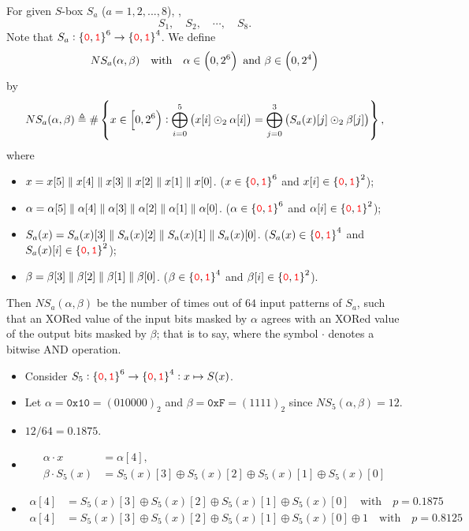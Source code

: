 \begin{tcolorbox}[colframe=defcolor,title={\color{white}\bf SBOX}]
\begin{definition}
For given $S$-box $S_a$ ($a = 1,2,...,8$), \ie, \[
S_1,\quad S_2,\quad\cdots,\quad S_8.
\] Note that $S_a:\set{\textcolor{red}{\texttt{0}},\textcolor{red}{\texttt{1}}}^{6}\to\set{\textcolor{red}{\texttt{0}},\textcolor{red}{\texttt{1}}}^{4}$. We define \[
NS_a(\alpha,\beta)\quad\text{with}\quad \alpha\in\intoo{0, 2^6}\ \text{and}\ \beta\in\intoo{0,2^4}
\] by
\[
NS_a(\alpha,\beta)\triangleq \#\set{x\in\intco{0, 2^6}:\bigoplus_{i=0}^5\of{x[i]\odot_2 \alpha[i]}=\bigoplus_{j=0}^3\of{S_a(x)[j]\odot_2 \beta[j]}},
\] where \begin{itemize}
	\item $x=x[5]\parallel x[4]\parallel x[3]\parallel x[2]\parallel x[1]\parallel x[0]$. ($x\in\set{\textcolor{red}{\texttt{0}},\textcolor{red}{\texttt{1}}}^{6}$ and $x[i]\in\set{\textcolor{red}{\texttt{0}},\textcolor{red}{\texttt{1}}}^2$);
	\item $\alpha=\alpha[5]\parallel \alpha[4]\parallel \alpha[3]\parallel \alpha[2]\parallel \alpha[1]\parallel \alpha[0]$. ($\alpha\in\set{\textcolor{red}{\texttt{0}},\textcolor{red}{\texttt{1}}}^{6}$ and $\alpha[i]\in\set{\textcolor{red}{\texttt{0}},\textcolor{red}{\texttt{1}}}^2$);
	\item $S_a(x)=S_a(x)[3]\parallel S_a(x)[2]\parallel S_a(x)[1]\parallel S_a(x)[0]$. ($S_a(x)\in\set{\textcolor{red}{\texttt{0}},\textcolor{red}{\texttt{1}}}^{4}$ and $S_a(x)[i]\in\set{\textcolor{red}{\texttt{0}},\textcolor{red}{\texttt{1}}}^2$);
	\item $\beta=\beta[3]\parallel \beta[2]\parallel \beta[1]\parallel \beta[0]$. ($\beta\in\set{\textcolor{red}{\texttt{0}},\textcolor{red}{\texttt{1}}}^{4}$ and $\beta[i]\in\set{\textcolor{red}{\texttt{0}},\textcolor{red}{\texttt{1}}}^2$).
\end{itemize}


Then $NS_a(\alpha,\beta)$ be the number of times out of $64$ input patterns of $S_a$, such that an XORed value of the input bits masked by $\alpha$ agrees with an XORed value of the output bits masked by $\beta$; that is to say,
where the symbol $\cdot$ denotes a bitwise AND operation.
\end{definition}
\end{tcolorbox}

\newpage
\begin{itemize}
	\item Consider $S_5:\set{\textcolor{red}{\texttt{0}},\textcolor{red}{\texttt{1}}}^6\to\set{\textcolor{red}{\texttt{0}},\textcolor{red}{\texttt{1}}}^4:x\mapsto S(x)$.
	\item Let $\alpha = \texttt{0x10} = (010000)_2$ and $\beta=\texttt{0xF}=(1111)_2$ since $NS_5(\alpha, \beta)=12$.
	\item $12/64=0.1875$.
	\item 
	\begin{align*}
		\alpha\cdot x&=\alpha[4],\\
		\beta\cdot S_5(x)&=S_5(x)[3]\oplus S_5(x)[2]\oplus S_5(x)[1]\oplus S_5(x)[0]
	\end{align*}
	\item \begin{align*}
		\alpha[4]&=S_5(x)[3]\oplus S_5(x)[2]\oplus S_5(x)[1]\oplus S_5(x)[0]\quad\text{with}\quad p=0.1875\\
		\alpha[4]&=S_5(x)[3]\oplus S_5(x)[2]\oplus S_5(x)[1]\oplus S_5(x)[0]\oplus 1\quad\text{with}\quad p=0.8125
	\end{align*}
\end{itemize}


